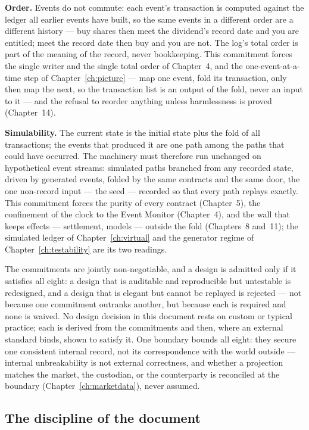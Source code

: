 \documentclass[11pt,a4paper]{article}
\begin{document}
\textbf{Order.} Events do not commute: each event's transaction is computed against the
ledger all earlier events have built, so the same events in a different order are a
different history --- buy shares then meet the dividend's record date and you are
entitled; meet the record date then buy and you are not. The log's total order is part
of the meaning of the record, never bookkeeping. This commitment forces the single
writer and the single total order of Chapter~4, and the one-event-at-a-time step of
Chapter~\ref{ch:picture} --- map one event, fold its transaction, only then map the
next, so the transaction list is an output of the fold, never an input to it --- and
the refusal to reorder anything unless harmlessness is proved (Chapter~14).

\textbf{Simulability.} The current state is the initial state plus the fold of all
transactions; the events that produced it are one path among the paths that could have
occurred. The machinery must therefore run unchanged on hypothetical event streams:
simulated paths branched from any recorded state, driven by generated events, folded by
the same contracts and the same door, the one non-record input --- the seed --- recorded
so that every path replays exactly. This commitment forces the purity of every contract
(Chapter~5), the confinement of the clock to the Event Monitor (Chapter~4), and the wall
that keeps effects --- settlement, models --- outside the fold (Chapters~8 and~11); the
simulated ledger of Chapter~\ref{ch:virtual} and the generator regime of
Chapter~\ref{ch:testability} are its two readings.

The commitments are jointly non-negotiable, and a design is admitted only if it
satisfies all eight: a design that is auditable and reproducible but untestable is
redesigned, and a design that is elegant but cannot be replayed is rejected --- not
because one commitment outranks another, but because each is required and none is
waived. No design decision in this document rests on custom or typical
practice; each is derived from the commitments and then, where an external standard
binds, shown to satisfy it. One boundary bounds all eight: they secure one consistent
internal record, not its correspondence with the world outside --- internal
unbreakability is not external correctness, and whether a projection matches the market,
the custodian, or the counterparty is reconciled at the boundary
(Chapter~\ref{ch:marketdata}), never assumed.

\subsection{The discipline of the document}
\end{document}
